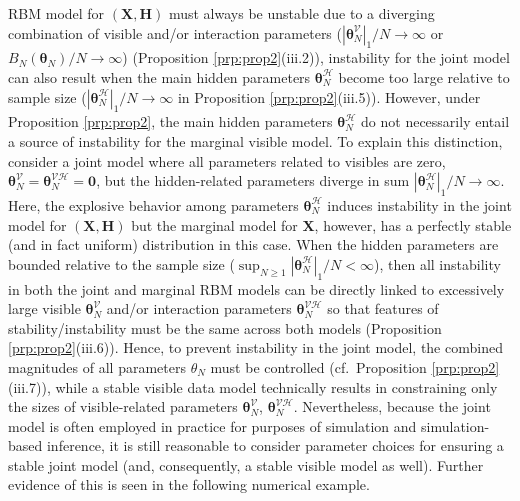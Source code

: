\documentclass[numbib]{imamat}
\theoremstyle{theorem}
\theoremstyle{lemma}
\theoremstyle{example}
\theoremstyle{corollary}
\theoremstyle{definition}
\theoremstyle{remark}
\theoremstyle{approximation}
\theoremstyle{scheme}
\newcommand{\Gam}{B_{N}(\boldsymbol \theta_N) }
\begin{document}
RBM model for \((\boldsymbol X,\boldsymbol H)\) must always be unstable
due to a diverging combination of visible and/or interaction parameters
(\(|\boldsymbol \theta_N^{\mathcal{V}}|_1/N\to \infty\) or
\(\Gam/N\to \infty\)) (Proposition \ref{prp:prop2}(iii.2)), instability
for the joint model can also result when the main hidden parameters
\(\boldsymbol \theta_N^{\mathcal{H}}\) become too large relative to
sample size (\(|\boldsymbol \theta_N^{\mathcal{H}}|_1/N\to \infty\) in
Proposition \ref{prp:prop2}(iii.5)). However, under Proposition
\ref{prp:prop2}, the main hidden parameters
\(\boldsymbol \theta_N^{\mathcal{H}}\) do not necessarily entail a
source of instability for the marginal visible model. To explain this
distinction, consider a joint model where all parameters related to
visibles are zero,
\(\boldsymbol \theta_N^{\mathcal{V}}= \boldsymbol \theta_N^{\mathcal{VH}}=\boldsymbol 0\),
but the hidden-related parameters diverge in sum
\(|\boldsymbol \theta_N^{\mathcal{H}}|_1/N\to \infty\). Here, the
explosive behavior among parameters
\(\boldsymbol \theta_N^{\mathcal{H}}\) induces instability in the joint
model for \((\boldsymbol X, \boldsymbol H)\) but the marginal model for
\(\boldsymbol X\), however, has a perfectly stable (and in fact uniform)
distribution in this case. When the hidden parameters are bounded
relative to the sample size
(\(\sup_{N\geq 1} |\boldsymbol \theta_N^{\mathcal{H}}|_1/N<\infty\)),
then all instability in both the joint and marginal RBM models can be
directly linked to excessively large visible
\(\boldsymbol \theta_N^{\mathcal{V}}\) and/or interaction parameters
\(\boldsymbol \theta_N^{\mathcal{VH}}\) so that features of
stability/instability must be the same across both models (Proposition
\ref{prp:prop2}(iii.6)). Hence, to prevent instability in the joint
model, the combined magnitudes of all parameters \(\theta_N\) must be
controlled (cf.~Proposition \ref{prp:prop2}(iii.7)), while a stable
visible data model technically results in constraining only the sizes of
visible-related parameters \(\boldsymbol \theta_N^{\mathcal{V}}\),
\(\boldsymbol \theta_N^{\mathcal{VH}}\). Nevertheless, because the joint
model is often employed in practice for purposes of simulation and
simulation-based inference, it is still reasonable to consider parameter
choices for ensuring a stable joint model (and, consequently, a stable
visible model as well). Further evidence of this is seen in the
following numerical example.
\end{document}
